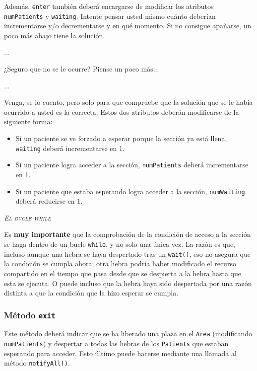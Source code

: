\documentclass[10pt,a4paper,spanish]{article}
\newcommand{\sombreado}[2]{
  \begin{shaded}
    \begin{center} \emph{\textsc{#1}} \end{center}
    \noindent #2\\
  \end{shaded}
}
\newcommand{\code}[1]{\texttt{#1}}
\begin{document}
Además, \code{enter} también deberá encargarse de modificar los atributos \code{numPatients} y \code{waiting}. Intente pensar usted mismo cuánto deberían incrementarse y/o decrementarse y en qué momento. Si no consigue apañarse, un poco más abajo tiene la solución.

\vspace{1cm}

...

\vspace{1cm}

¿Seguro que no se le ocurre? Piense un poco más...

\vspace{1cm}

...

\vspace{1cm}

Venga, se lo cuento, pero solo para que compruebe que la solución que se le había ocurrido a usted es la correcta. Estos dos atributos deberán modificarse de la siguiente forma:
\begin{itemize}
    \item Si un paciente se ve forzado a esperar porque la sección ya está llena, \code{waiting} deberá incrementarse en 1.
    \item Si un paciente logra acceder a la sección, \code{numPatients} deberá incrementarse en 1.
    \item Si un paciente que estaba esperando logra acceder a la sección, \code{numWaiting} deberá reducirse en 1.
\end{itemize}

\sombreado{El bucle while}{Es \textbf{muy importante} que la comprobación de la condición de acceso a la sección se haga dentro de un bucle \code{while}, y no solo una única vez. La razón es que, incluso aunque una hebra se haya despertado tras un \code{wait()}, eso no asegura que la condición se cumpla ahora; otra hebra podría haber modificado el recurso compartido en el tiempo que pasa desde que se despierta a la hebra hasta que esta se ejecuta. O puede incluso que la hebra haya sido despertada por una razón distinta a que la condición que la hizo esperar se cumpla.}

\subsubsection{Método \code{exit}}

Este método deberá indicar que se ha liberado una plaza en el \code{Area} (modificando \code{numPatients}) y despertar a todas las hebras de los \code{Patients} que estaban esperando para acceder. Esto último puede hacerse mediante una llamada al método \code{notifyAll()}.
\end{document}
